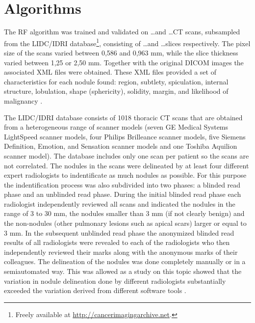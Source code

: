 \section{Algorithms}
The RF algorithm was trained and validated on \ldots and \ldots CT scans,
subsampled from the LIDC/IDRI database\footnote{Freely available at
\url{http://cancerimagingarchive.net}.}, consisting of \ldots and \ldots slices
respectively. The pixel size of the scans varied between 0,586 and 0,963 mm,
while the slice thickness varied between 1,25 or 2,50 mm. Together with the
original DICOM images the associated XML files were obtained. These XML files
provided a set of characteristics for each nodule found: region, subtlety,
spiculation, internal structure, lobulation, shape (sphericity), solidity,
margin, and likelihood of malignancy \cite{lidcbase}.


The LIDC/IDRI database consists of 1018 thoracic CT scans that are obtained from
a heterogeneous range of scanner models (seven GE Medical Systems LightSpeed
scanner models, four Philips Brilleance scanner models, five Siemens Definition,
Emotion, and Sensation scanner models and one Toshiba Aquilion scanner model).
The database includes only one scan per patient so the scans are not correlated.
The nodules in the scans were delineated by at least four different expert
radiologists to indentificate as much nodules as possible. For this purpose the
indentification process was also subdivided into two phases: a blinded read
phase and an unblinded read phase. During the initial blinded read phase each
radiologist independently reviewed all scans and indicated the nodules in the
range of 3 to 30 mm, the nodules smaller than 3 mm (if not clearly benign) and
the non-nodules (other pulmonary lesions such as apical scars) larger or equal to
3 mm. In the subsequent unblinded read phase the anonymized blinded read results
of all radiologists were revealed to each of the radiologists who then
independently reviewed their marks along with the anonymous marks of their
colleagues. The delineation of the nodules was done completely manually or in a
semiautomated way. This was allowed as a study on this topic showed that the
variation in nodule delineation done by different radiologists
substantially exceeded the variation derived from different software tools
\cite{lidcbase}.


